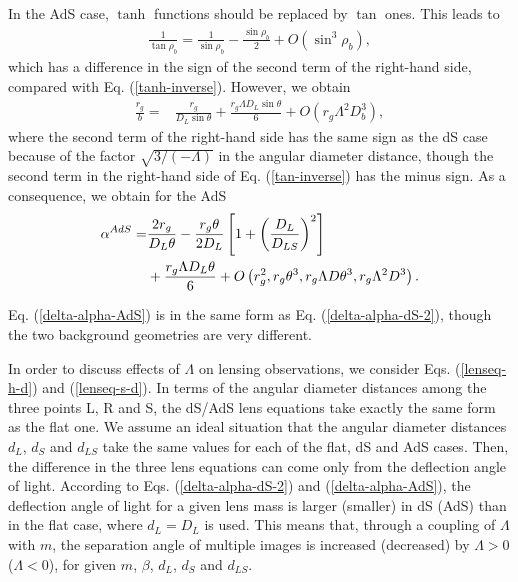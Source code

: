 \documentclass[twocolumn,showpacs,preprintnumbers,amsmath,amssymb]{revtex4-1}
\begin{document}
In the AdS case, $\tanh$ functions 
should be replaced by $\tan$ ones. 
This leads to 
\begin{align}
\frac{1}{\tan\rho_b} 
= 
\frac{1}{\sin\rho_b} - \frac{\sin\rho_b}{2} 
+ O\left(\sin^3\rho_b\right) , 
\label{tan-inverse}
\end{align}
which has a difference in the sign of 
the second term of the right-hand side, 
compared with Eq. (\ref{tanh-inverse}). 
However, we obtain 
\begin{align}
\frac{r_g}{b} 
=&
\frac{r_g}{D_L \sin\theta} 
+
\frac{r_g \Lambda D_L \sin\theta}{6} 
+O\left( r_g \Lambda^2 D_b^3 \right) ,
\label{2m-AdS}
\end{align}
where the second term of the right-hand side has 
the same sign as the dS case 
because of the factor $\sqrt{3/(-\Lambda)}$ 
in the angular diameter distance, 
though 
the second term in the right-hand side of Eq. (\ref{tan-inverse}) 
has the minus sign.  
As a consequence, 
we obtain for the AdS 
\begin{align}
\alpha^{AdS}
=&
  \frac{2 r_g}{D_L \theta} 
- \frac{r_g \theta}{2D_L} 
\left[  
1 + \left(\frac{D_L}{D_{LS}}\right)^2 
\right]
\notag\\
&
  + \frac{r_g \Lambda D_L \theta}{6} 
 + O\left(r_g^2, r_g \theta^3, r_g \Lambda D \theta^3, r_g \Lambda^2 D^3 \right) .\label{delta-alpha-AdS}
\end{align}

Eq. (\ref{delta-alpha-AdS}) is in the same form as 
Eq. (\ref{delta-alpha-dS-2}), 
though the two background geometries are very different. 


In order to discuss effects of $\Lambda$ 
on lensing observations, we consider 
Eqs. (\ref{lenseq-h-d}) and (\ref{lenseq-s-d}).  
In terms of the angular diameter distances 
among the three points L, R and S,  
the dS/AdS lens equations take exactly the same form as the flat one. 
We assume an ideal situation that 
the angular diameter distances 
$d_L$, $d_S$ and $d_{LS}$ take the same values 
for each of the flat, dS and AdS cases. 
Then, the difference in the three lens equations can come only from 
the deflection angle of light. 
According to Eqs. (\ref{delta-alpha-dS-2}) and (\ref{delta-alpha-AdS}), 
the deflection angle of light for a given lens mass 
is larger (smaller) in dS (AdS) than in the flat case, 
where $d_L = D_L$ is used. 
This means that, 
through a coupling of $\Lambda$ with $m$, 
the separation angle of multiple images 
is increased (decreased) by $\Lambda > 0$ ($\Lambda < 0$), 
for given $m$, $\beta$, $d_L$, $d_S$ and $d_{LS}$. 
\end{document}
